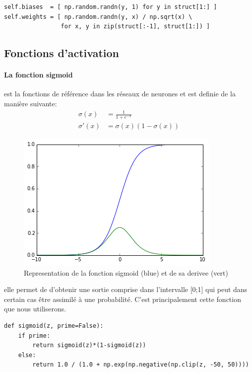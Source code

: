 \documentclass[11pt]{article}
\begin{document}
\begin{lstlisting}
self.biases  = [ np.random.randn(y, 1) for y in struct[1:] ]
self.weights = [ np.random.randn(y, x) / np.sqrt(x) \
				for x, y in zip(struct[:-1], struct[1:]) ]
\end{lstlisting}

\newpage
\subsection{Fonctions d'activation}
\paragraph{La fonction sigmoid} est la fonctions de r\'ef\'erence dans les r\'eseaux de
neurones et est definie de la mani\`ere suivante: \\
\begin{equation}
	\begin{aligned}
		\sigma(x)  &= \frac{1}{1+e^{-x}} \\
		\sigma'(x) &= \sigma(x)(1-\sigma(x))
	\end{aligned}
\end{equation}
\begin{figure}[htp]
	\centering
	\includegraphics[scale=.5]{img/act_sigmoid.png}
	\caption{Representation de la fonction sigmoid (blue) et de sa derivee (vert)}
\end{figure}

elle permet de d'obtenir une sortie comprise dans l'intervalle [0;1] qui peut
dans certain cas \^etre assimil\'e \`a une probabilit\'e. C'est principalement
cette fonction que nous utiliserons.

\begin{lstlisting}
def sigmoid(z, prime=False):
    if prime:
		return sigmoid(z)*(1-sigmoid(z))
	else:
		return 1.0 / (1.0 + np.exp(np.negative(np.clip(z, -50, 50))))
\end{lstlisting}
\end{document}
